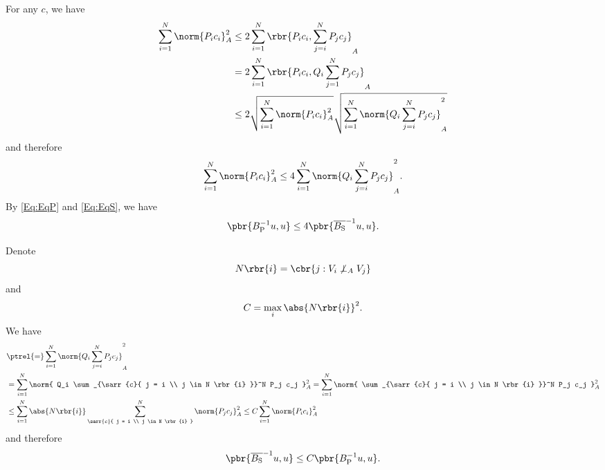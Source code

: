 \documentclass[english, nochinese]{pnote}
\begin{document}
For any $c$, we have
\begin{equation}
\begin{split}
\sum_{ i = 1 }^N \norm{ P_i c_i }_A^2 &\le 2 \sum_{ i = 1 }^N \rbr{ P_i c_i, \sum_{ j = i }^N P_j c_j }_A \\
&= 2 \sum_{ i = 1 }^N \rbr{ P_i c_i, Q_i \sum_{ j = 1 }^N P_j c_j }_A \\
&\le 2 \sqrt{ \sum_{ i = 1 }^N \norm{ P_i c_i }_A^2 } \sqrt{ \sum_{ i = 1 }^N \norm{ Q_i \sum_{ j = i }^N P_j c_j }_A^2 }
\end{split}
\end{equation}
and therefore
\begin{equation}
\sum_{ i = 1 }^N \norm{ P_i c_i }_A^2 \le 4 \sum_{ i = 1 }^N \norm{ Q_i \sum_{ j = i }^N P_j c_j }_A^2.
\end{equation}
By \eqref{Eq:EqP} and \eqref{Eq:EqS}, we have
\begin{equation}
\pbr{ B_{\text{P}}^{-1} u, u } \le 4 \pbr{ \overline{B_{\text{S}}}^{-1} u, u }.
\end{equation}

Denote
\begin{equation}
N \rbr{i} = \cbr{ j : V_i \not \perp_A V_j }
\end{equation}
and
\begin{equation}
C = \max_i \abs{ N \rbr{i} }^2.
\end{equation}
We have
\begin{equation}
\begin{split}
&\ptrel{=} \sum_{ i = 1 }^N \norm{ Q_i \sum_{ j = i }^N P_j c_j }_A^2 \\
&= \sum_{ i = 1 }^N \norm{ Q_i \sum_{\sarr{c}{ j = i \\ j \in N \rbr{i} }}^N P_j c_j }_A^2 = \sum_{ i = 1 }^N \norm{ \sum_{\sarr{c}{ j = i \\ j \in N \rbr{i} }}^N P_j c_j }_A^2 \\
&\le \sum_{ i = 1 }^N \abs{ N \rbr{i} } \sum_{\sarr{c}{ j = i \\ j \in N \rbr{i} }}^N \norm{ P_j c_j }_A^2 \le C \sum_{ i = 1 }^N \norm{ P_i c_i }_A^2
\end{split}
\end{equation}
and therefore
\begin{equation}
\pbr{ \overline{B_{\text{S}}}^{-1} u, u } \le C \pbr{ B_{\text{P}}^{-1} u, u }.
\end{equation}
\end{document}
